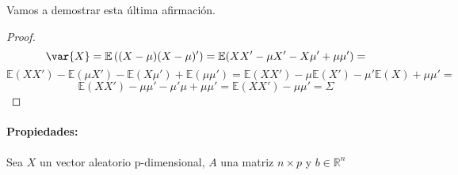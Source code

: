 Vamos a demostrar esta última afirmación.

\begin{proof}
\[
\var{X}=\mathbb{E}\left((X-\mu)(X-\mu)'\right) = \mathbb{E}(XX'- \mu X' - X \mu'+\mu \mu')=
\]
\[
\mathbb{E}(XX')-\mathbb{E}(\mu X')-\mathbb{E}(X\mu')+\mathbb{E}(\mu \mu')= \mathbb{E}(XX')-\mu \mathbb{E}(X')-\mu' \mathbb{E}(X)+\mu\mu'=
\]
\[
 \mathbb{E}(XX')-\mu \mu'-\mu' \mu+\mu \mu' = \mathbb{E}(XX')-\mu \mu'=\Sigma
\]
\end{proof}

\paragraph{Propiedades:}

Sea $X$ un vector aleatorio p-dimensional, $A$ una matriz $n\times p$ y $b∈ℝ^n$

